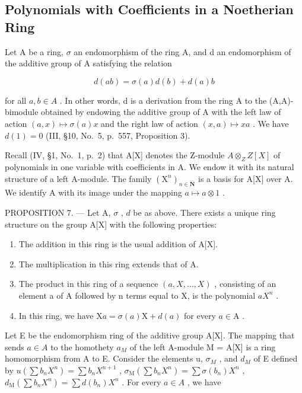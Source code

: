 \subsection{Polynomials with Coefficients in a Noetherian Ring}

Let A be a ring, \(\sigma\) an endomorphism of the ring A, and d an endomorphism of the additive group of A satisfying the relation

\[
d (a b) = \sigma (a) d (b) + d (a) b\tag{1}
\]

for all \(a, b \in A\) . In other words, d is a derivation from the ring A to the (A,A)-bimodule obtained by endowing the additive group of A with the left law of action \((a, x) \mapsto \sigma(a)x\) and the right law of action \((x, a) \mapsto xa\) . We have \(d(1) = 0\) (III, §10, No.~5, p.~557, Proposition 3).

Recall (IV, §1, No.~1, p.~2) that A{[}X{]} denotes the Z-module \(A \otimes_{Z} Z[X]\) of polynomials in one variable with coefficients in A. We endow it with its natural structure of a left A-module. The family \((\mathrm{X}^{n})_{n \in \mathbf{N}}\) is a basis for A{[}X{]} over A. We identify A with its image under the mapping \(a \mapsto a \otimes 1\) .

PROPOSITION 7. --- Let A, \(\sigma\) , \(d\) be as above. There exists a unique ring structure on the group A{[}X{]} with the following properties:

\begin{enumerate}
\def\labelenumi{\alph{enumi})}
\item
  The addition in this ring is the usual addition of A{[}X{]}.
\item
  The multiplication in this ring extends that of A.
\item
  The product in this ring of a sequence \((a,X,\ldots,X)\) , consisting of an element a of A followed by n terms equal to X, is the polynomial \(aX^{n}\) .
\item
  In this ring, we have \(\mathrm{X}a = \sigma(a)\mathrm{X} + d(a)\) for every \(a \in \mathrm{A}\) .
\end{enumerate}

Let E be the endomorphism ring of the additive group A{[}X{]}. The mapping that sends \(a \in A\) to the homothety \(a_{M}\) of the left A-module M = A{[}X{]} is a ring homomorphism from A to E. Consider the elements u, \(\sigma_{M}\) , and \(d_{M}\) of E defined by \(u(\sum b_{n}X^{n}) = \sum b_{n}X^{n+1}\) , \(\sigma_{\mathrm{M}}(\sum b_{n}X^{n}) = \sum \sigma(b_{n})X^{n}\) , \(d_{\mathrm{M}}(\sum b_{n}X^{n}) = \sum d(b_{n})X^{n}\) . For every \(a \in A\) , we have

